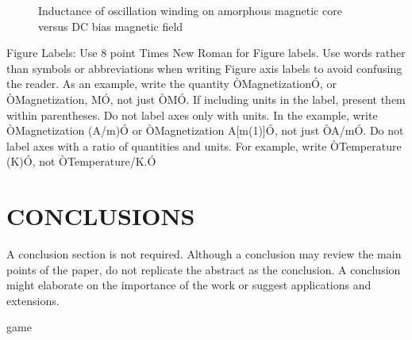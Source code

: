 \documentclass[letterpaper, 10 pt, conference]{ieeeconf}  %
\begin{document}
   \begin{figure}[thpb]
      \centering
      \caption{Inductance of oscillation winding on amorphous
       magnetic core versus DC bias magnetic field}
      \label{figurelabel}
   \end{figure}
   

Figure Labels: Use 8 point Times New Roman for Figure labels. Use words rather than symbols or abbreviations when writing Figure axis labels to avoid confusing the reader. As an example, write the quantity ÒMagnetizationÓ, or ÒMagnetization, MÓ, not just ÒMÓ. If including units in the label, present them within parentheses. Do not label axes only with units. In the example, write ÒMagnetization (A/m)Ó or ÒMagnetization {A[m(1)]}Ó, not just ÒA/mÓ. Do not label axes with a ratio of quantities and units. For example, write ÒTemperature (K)Ó, not ÒTemperature/K.Ó

\section{CONCLUSIONS}

A conclusion section is not required. Although a conclusion may review the main points of the paper, do not replicate the abstract as the conclusion. A conclusion might elaborate on the importance of the work or suggest applications and extensions. 

\addtolength{\textheight}{-12cm}   %
                         game         %




\end{document}
